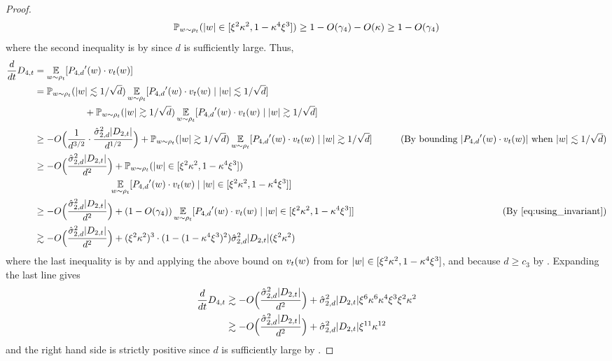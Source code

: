 \begin{proof}
\begin{align}
\mathbb{P}_{w \sim \rho_t}(|w| \in [\xi^2 \kappa^2, 1 - \kappa^4 \xi^3])
 \geq 1 - O(\gamma_4) - O(\kappa) \geq 1 - O(\gamma_4)
\end{align}
where the second inequality is by  since $d$ is sufficiently large. Thus,
\begin{align}
\frac{d}{dt} D_{4, t}
& = \E_{\w \sim \rho_t} [\PfourD'(\w) \cdot \vel_t(\w)] \\
& = \Prob_{\w \sim \rho_t} (|\w| \lesssim 1/\sqrt{d}) \E_{\w \sim \rho_t} [\PfourD'(\w) \cdot \vel_t(\w) \mid |\w| \lesssim 1/ \sqrt{d}] \\
& \nextlinespace\nextlinespace + \Prob_{\w \sim \rho_t} (|\w| \gtrsim 1/\sqrt{d}) \E_{\w \sim \rho_t} [\PfourD'(\w) \cdot \vel_t(\w) \mid |\w| \gtrsim 1/\sqrt{d}] \\
& \geq - O\Big(\frac{1}{d^{3/2}} \cdot \frac{\sigmaCoeffTwo^2 |D_{2, t}|}{d^{1/2}}\Big) + \Prob_{\w \sim \rho_t} (|\w| \gtrsim 1/\sqrt{d}) \E_{\w \sim \rho_t} [\PfourD'(\w) \cdot \vel_t(\w) \mid |\w| \gtrsim 1/\sqrt{d}] 
& \tag{By bounding $|\PfourD'(\w) \cdot \vel_t(\w)|$ when $|\w| \lesssim 1/\sqrt{d}$} \\
& \geq - O\Big(\frac{\sigmaCoeffTwo^2 |D_{2, t}|}{d^2}\Big) + \Prob_{\w \sim \rho_t}(|\w| \in [\xi^2 \kappa^2, 1 - \kappa^4 \xi^3]) \\
& \nextlinespace\nextlinespace\nextlinespace \E_{\w \sim \rho_t} [\PfourD'(\w) \cdot \vel_t(\w) \mid |\w| \in [\xi^2 \kappa^2, 1 - \kappa^4 \xi^3]] \\
& \geq - O\Big(\frac{\sigmaCoeffTwo^2 |D_{2, t}|}{d^2}\Big) + (1 - O(\gamma_4)) \E_{\w \sim \rho_t} [\PfourD'(\w) \cdot \vel_t(\w) \mid |\w| \in [\xi^2 \kappa^2, 1 - \kappa^4 \xi^3]]
& \tag{By \Cref{eq:using_invariant}} \\
& \gtrsim - O\Big(\frac{\sigmaCoeffTwo^2 |D_{2, t}|}{d^2}\Big) + (\xi^2 \kappa^2)^3 \cdot (1 - (1 - \kappa^4 \xi^3)^2) \sigmaCoeffTwo^2 |D_{2, t}| (\xi^2 \kappa^2)
\end{align}
where the last inequality is by  and applying the above bound on $v_t(w)$ from  for $|w| \in [\xi^2 \kappa^2, 1 - \kappa^4 \xi^3]$, and because $d \geq c_3$ by . Expanding the last line gives
\begin{align}
\frac{d}{dt} D_{4, t}
& \gtrsim -O\Big(\frac{\hat{\sigma}_{2, d}^2 |D_{2, t}|}{d^2}\Big) + \hat{\sigma}_{2, d}^2 |D_{2, t}| \xi^6 \kappa^6 \kappa^4 \xi^3 \xi^2 \kappa^2 \\
& \gtrsim -O\Big(\frac{\hat{\sigma}_{2, d}^2 |D_{2, t}|}{d^2}\Big) + \hat{\sigma}_{2, d}^2 |D_{2, t}| \xi^{11} \kappa^{12}
\end{align}
and the right hand side is strictly positive since $d$ is sufficiently large by .
\end{proof}

